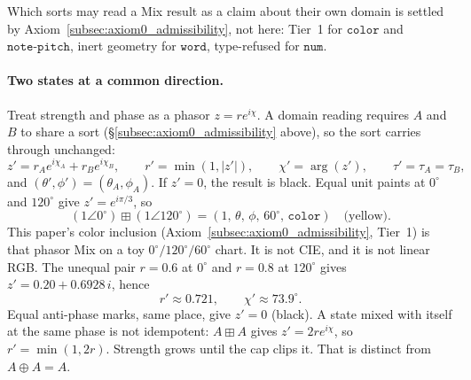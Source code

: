 \documentclass[12pt, a4paper]{article}
\begin{document}
Which sorts may read a Mix result as a claim about their own domain is
settled by Axiom~\ref{subsec:axiom0_admissibility}, not here: Tier~1
for $\mathtt{color}$ and $\mathtt{note\text{-}pitch}$, inert geometry
for $\mathtt{word}$, type-refused for $\mathtt{num}$.

\paragraph{Two states at a common direction.}
Treat strength and phase as a phasor $z=r e^{i\chi}$. A domain reading
requires $A$ and $B$ to share a sort (\S\ref{subsec:axiom0_admissibility}
above), so the sort carries through unchanged:
\begin{equation}
    z' = r_A e^{i\chi_A} + r_B e^{i\chi_B},
    \qquad
    r' = \min(1,|z'|),
    \qquad
    \chi' = \arg(z'),
    \qquad
    \tau' = \tau_A = \tau_B,
    \label{eq:interference_formal}
\end{equation}
and $(\theta',\phi')=(\theta_A,\phi_A)$. If $z'=0$, the result is
black. Equal unit paints at $0^\circ$ and $120^\circ$ give
$z'=e^{i\pi/3}$, so
\[
(1\angle 0^\circ)\boxplus(1\angle 120^\circ)
=(1,\,\theta,\,\phi,\,60^\circ,\,\mathtt{color})
\quad\text{(yellow)}.
\]
This paper's color inclusion
(Axiom~\ref{subsec:axiom0_admissibility}, Tier~1) is that phasor Mix
on a toy $0^\circ/120^\circ/60^\circ$ chart. It is not CIE, and it is
not linear RGB.
The unequal pair $r=0.6$ at $0^\circ$ and $r=0.8$ at $120^\circ$
gives $z'=0.20+0.6928\,i$, hence
\[
r'\approx 0.721,\qquad \chi'\approx 73.9^\circ.
\]
Equal anti-phase marks, same place, give $z'=0$ (black).
A state mixed with itself at the same phase is not idempotent:
$A\boxplus A$ gives $z'=2r e^{i\chi}$, so $r'=\min(1,2r)$.
Strength grows until the cap clips it. That is distinct from
$A\oplus A=A$.
\end{document}
